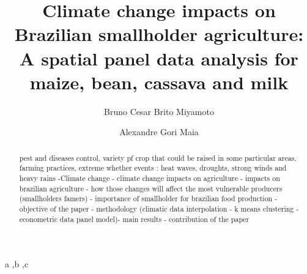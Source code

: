 \documentclass[12pt,a4paper]{elsarticle}
\begin{document}
	\begin{frontmatter}


		
		\title{Climate change impacts on Brazilian smallholder agriculture: A spatial panel data analysis for maize, bean, cassava and milk }
		
		\author{Bruno Cesar Brito Miyamoto}
		\author{Alexandre Gori Maia}
	   	   
	   \address[1]{UNICAMP,Brasil}
	   
		
	
		
		
		

		\begin{abstract}
			
			pest and diseases control, variety pf crop that could be raised in some particular areas, farming practices, extreme whether events : heat waves, droughts, strong winds and heavy rains
		-Climate change - climate change impacts on agriculture - impacts on brazilian agriculture -  how those changes will affect the most vulnerable producers (smallholders famers) -  importance of smallholder for brazilian food production -  objective of the paper - methodology (climatic data interpolation - k means clustering - econometric data panel model)- main results - contribution of the paper
		

		\end{abstract}
		
		\begin{keyword}
			a \sep b \sep c
		\end{keyword}

	\end{frontmatter}
\end{document}
